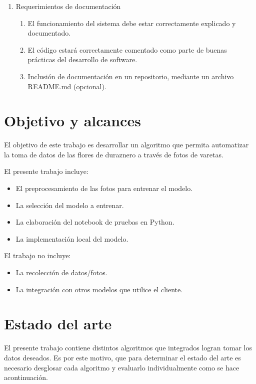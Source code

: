 \begin{enumerate}
\begin{enumerate}
		\end{enumerate}
	\item Requerimientos de documentación
	\begin{enumerate}
			\item El funcionamiento del sistema debe estar correctamente explicado y documentado.
			 \item El código estará correctamente comentado como parte de buenas prácticas del desarrollo de software.
			 \item Inclusión de documentación en un repositorio, mediante un archivo README.md (opcional).
		\end{enumerate}
\end{enumerate}

\section{Objetivo y alcances}

El objetivo de este trabajo es desarrollar un algoritmo que permita automatizar la toma de datos de las flores de duraznero a través de fotos de varetas.

El presente trabajo incluye:
\begin{itemize}
	\item El preprocesamiento de las fotos para entrenar el modelo.
	\item La selección del modelo a entrenar.
	\item La elaboración del notebook de pruebas en Python.
	\item La implementación local del modelo.
\end{itemize}

El trabajo no incluye:
\begin{itemize}
	\item La recolección de datos/fotos.
	\item La integración con otros modelos que utilice el cliente.
\end{itemize}



\section{Estado del arte}

El presente trabajo contiene distintos algoritmos que integrados logran tomar los datos deseados. Es por este motivo, que para determinar el estado del arte es necesario desglosar cada algoritmo y evaluarlo individualmente como se hace acontinuación.

